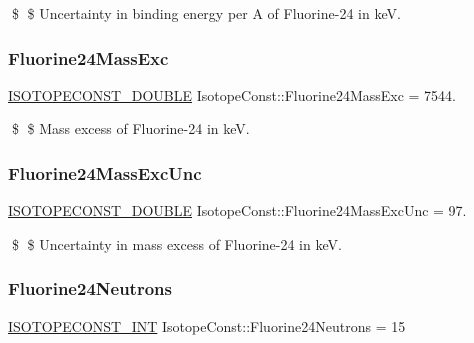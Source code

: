 \$ \$ Uncertainty in binding energy per A of Fluorine-\/24 in keV. \mbox{\label{group___isotope_const-_fluorine-_f24_gabb93d014f843b66f311441b938078d8e}} 
\subsubsection{\texorpdfstring{Fluorine24\+Mass\+Exc}{Fluorine24MassExc}}
{\footnotesize\ttfamily \mbox{\hyperlink{group___isotope_const-_macros_ga8f45a7272ce02c0b4c65c44636ed719a}{I\+S\+O\+T\+O\+P\+E\+C\+O\+N\+S\+T\+\_\+\+D\+O\+U\+B\+LE}} Isotope\+Const\+::\+Fluorine24\+Mass\+Exc = 7544.}

\$ \$ Mass excess of Fluorine-\/24 in keV. \mbox{\label{group___isotope_const-_fluorine-_f24_gac7e027a7fb4e7962d321ddca577022ea}} 
\subsubsection{\texorpdfstring{Fluorine24\+Mass\+Exc\+Unc}{Fluorine24MassExcUnc}}
{\footnotesize\ttfamily \mbox{\hyperlink{group___isotope_const-_macros_ga8f45a7272ce02c0b4c65c44636ed719a}{I\+S\+O\+T\+O\+P\+E\+C\+O\+N\+S\+T\+\_\+\+D\+O\+U\+B\+LE}} Isotope\+Const\+::\+Fluorine24\+Mass\+Exc\+Unc = 97.}

\$ \$ Uncertainty in mass excess of Fluorine-\/24 in keV. \mbox{\label{group___isotope_const-_fluorine-_f24_ga51a833e502384973f697e9df920ac2ed}} 
\subsubsection{\texorpdfstring{Fluorine24\+Neutrons}{Fluorine24Neutrons}}
{\footnotesize\ttfamily \mbox{\hyperlink{group___isotope_const-_macros_ga5f18360b3e99483a35c32d789e62621c}{I\+S\+O\+T\+O\+P\+E\+C\+O\+N\+S\+T\+\_\+\+I\+NT}} Isotope\+Const\+::\+Fluorine24\+Neutrons = 15}

